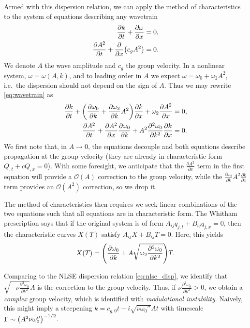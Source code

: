 \documentclass[11pt,
        usenames, %
        dvipsnames %
    ]{report}
\newcommand*{\pd}[2]{\frac{\partial#1}{\partial#2}}
\newcommand*{\ptd}[2]{\frac{\partial^2 #1}{\partial#2^2}}
\DeclarePairedDelimiter\p{\lparen}{\rparen}
\begin{document}
Armed with this dispersion relation, we can apply the method of characteristics
to the system of equations describing any wavetrain
\begin{subequations}\label{eq:wavetrain}
    \begin{align}
        \pd{k}{t} + \pd{\omega}{x} &= 0,\label{eq:wavetrain_1}\\
        \pd{A^2}{t} + \pd{}{x}\p*{c_gA^2} &= 0.\label{eq:wavetrain_2}
    \end{align}
\end{subequations}
We denote $A$ the wave amplitude and $c_g$ the group velocity. In a nonlinear
system, $\omega = \omega(A, k)$, and to leading order in $A$ we expect $\omega =
\omega_0 + \omega_2A^2$, i.e.\ the dispersion should not depend on the sign of
$A$. Thus we may rewrite \autoref{eq:wavetrain} as
\begin{subequations}\label{eq:wavetrain_mod}
    \begin{align}
        \pd{k}{t} + \p*{\pd{\omega_{0}}{k} + \pd{\omega_2}{k}A^2}\pd{k}{x}
            + \omega_2 \pd{A^2}{x} &= 0,\\
        \pd{A^2}{t} + \pd{A^2}{x}\pd{\omega_0}{k} + A^2\ptd{\omega_0}{k}\pd{k}{x}
            &= 0.
    \end{align}
\end{subequations}
We first note that, in $A \to 0$, the equations decouple and both equations
describe propagation at the group velocity (they are already in characteristic
form $Q_{,t} + cQ_{,x} = 0$). With some foresight, we anticipate that the
$\pd{A^2}{x}$ term in the first equation will provide a $\mathcal{O}(A)$
correction to the group velocity, while the $\pd{\omega_2}{k}A^2\pd{k}{x}$ term
provides an $\mathcal{O}(A^2)$ correction, so we drop it.

The method of characteristics then requires we seek linear combinations of the
two equations such that all equations are in characteristic form. The Whitham
prescription says that if the original system is of form $A_{ij}q_{j, t} +
B_{ij}q_{j, x} = 0$, then the characteristic curves $X(T)$ satisfy $A_{ij}X +
B_{ij}T = 0$. Here, this yields
\begin{equation}
    X(T) = \p*{\pd{\omega_0}{k} \pm A\sqrt{\omega_2 \ptd{\omega_0}{k}}}T.
\end{equation}

Comparing to the NLSE dispersion relation \autoref{eq:nlse_disp}, we identify
that $\sqrt{-\nu \ptd{\omega_0}{k}}A$ is the correction to the group velocity.
Thus, if $\nu\ptd{\omega_0}{k} > 0$, we obtain a \emph{complex} group velocity,
which is identified with \emph{modulational instability}. Naively, this might
imply a steepening $k = c_{g, 0}t - i\sqrt{\nu\omega_0''}At$ with timescale
$\Gamma \sim \p*{A^2\nu\omega_0''}^{-1/2}$.
\end{document}

